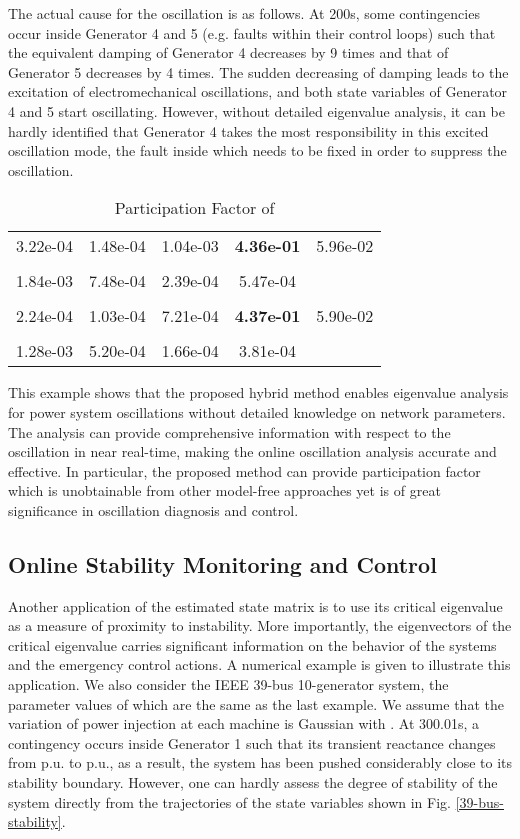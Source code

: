\documentclass[journal]{IEEEtran}
\begin{document}
The actual cause for the oscillation is as follows. At 200s, some contingencies occur inside Generator 4 and 5 (e.g. faults within their control loops) such that the equivalent damping of Generator 4 decreases by 9 times and that of Generator 5 decreases by 4 times. The sudden decreasing of damping leads to the excitation of electromechanical oscillations, and both state variables of Generator 4 and 5 start oscillating. However, without detailed eigenvalue analysis, it can be hardly identified that Generator 4 takes the most responsibility in this excited oscillation mode, the fault inside which needs to be fixed in order to suppress the oscillation. \begin{table}[!ht]
\centering
\caption{Participation Factor of }\label{39-oscillationPF}
\begin{tabular}{|c|c|c|c|c|}
\hline
& &&&\\
\hline
3.22e-04&1.48e-04&1.04e-03&\textbf{4.36e-01}&5.96e-02\\
\hline
& &&&\\
\hline
{1.84e-03}&{7.48e-04}&{2.39e-04}&{5.47e-04}&\\
\hline
&& &&\\
\hline
{2.24e-04}&{1.03e-04}&{7.21e-04}&\textbf{{4.37e-01}}&{5.90e-02}\\
\hline
&& &&\\
\hline
{1.28e-03}&{5.20e-04}&{1.66e-04}&{3.81e-04}&\\
\hline
\end{tabular}
\end{table}

This example shows that the proposed hybrid method enables eigenvalue analysis for power system oscillations without detailed knowledge on network parameters. The analysis can provide comprehensive information with respect to the oscillation in near real-time, making the online oscillation analysis accurate and effective. In particular, the proposed method can provide participation factor which is unobtainable from other model-free approaches yet is of great significance in oscillation diagnosis and control.

\subsection{Online Stability Monitoring and Control}
Another application of the estimated state matrix is to use its critical eigenvalue as a measure of proximity to instability. More importantly, the eigenvectors of the critical eigenvalue carries significant information on the behavior of the systems and the emergency control actions. A numerical example is given to illustrate this application.
We also consider the IEEE 39-bus 10-generator system, the parameter values of which are the same as the last example. We assume that the variation of power injection at each machine is Gaussian with .  At 300.01s, a contingency occurs inside Generator 1 such that its transient reactance  changes from  p.u. to  p.u., as a result, the system has been pushed considerably close to its stability boundary. However, one can hardly  assess the degree of stability of the system directly from the trajectories of the state variables shown in Fig. \ref{39-bus-stability}.
\end{document}
